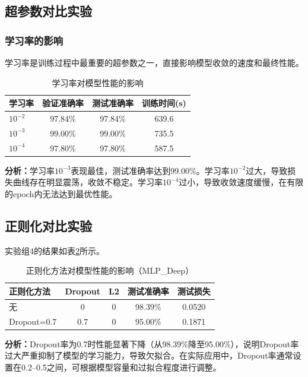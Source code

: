 \documentclass[12pt,a4paper]{ctexart}
\begin{document}
\subsection{超参数对比实验}

\subsubsection{学习率的影响}
学习率是训练过程中最重要的超参数之一，直接影响模型收敛的速度和最终性能。

\begin{table}[H]
\centering
\caption{学习率对模型性能的影响}
\label{tab:lr_result}
\vspace{0.2cm}
\begin{tabular}{lccc}
\toprule
\textbf{学习率} & \textbf{验证准确率} & \textbf{测试准确率} & \textbf{训练时间(s)} \\
\midrule
$10^{-2}$ & 97.84\% & 97.84\% & 639.6 \\
$10^{-3}$ & 99.00\% & 99.00\% & 735.5 \\
$10^{-4}$ & 97.80\% & 97.80\% & 587.5 \\
\bottomrule
\end{tabular}
\end{table}

\textbf{分析：}学习率$10^{-3}$表现最佳，测试准确率达到99.00\%。学习率$10^{-2}$过大，导致损失曲线存在明显震荡，收敛不稳定。学习率$10^{-4}$过小，导致收敛速度缓慢，在有限的epoch内无法达到最优性能。

\subsection{正则化对比实验}
实验组4的结果如表\ref{tab:reg_result}所示。

\begin{table}[H]
\centering
\caption{正则化方法对模型性能的影响（MLP\_Deep）}
\label{tab:reg_result}
\vspace{0.2cm}
\begin{tabular}{lcccc}
\toprule
\textbf{正则化方法} & \textbf{Dropout} & \textbf{L2} & \textbf{测试准确率} & \textbf{测试损失} \\
\midrule
无 & 0 & 0 & 98.39\% & 0.0520 \\
Dropout=0.7 & 0.7 & 0 & 95.00\% & 0.1871 \\
\bottomrule
\end{tabular}
\end{table}

\textbf{分析：}Dropout率为0.7时性能显著下降（从98.39\%降至95.00\%），说明Dropout率过大严重抑制了模型的学习能力，导致欠拟合。在实际应用中，Dropout率通常设置在0.2--0.5之间，可根据模型容量和过拟合程度进行调整。
\end{document}
